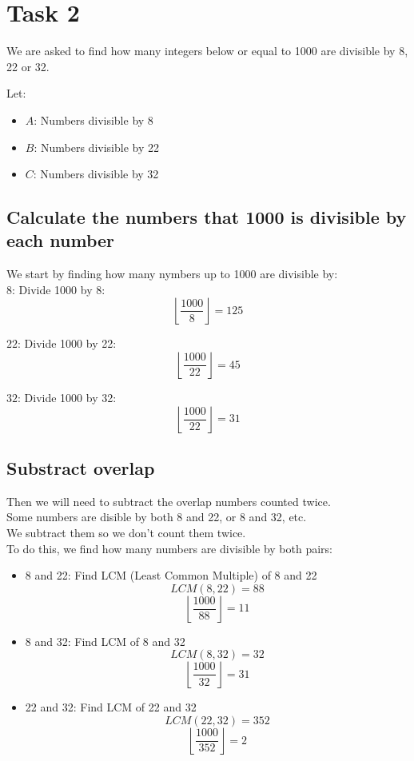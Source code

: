 \documentclass[11pt]{article}
\begin{document}
\newpage
\section{Task 2}
\label{sec:org3dbf359}
We are asked to find how many integers below or equal to 1000 are divisible by 8, 22 or 32.

Let:
\begin{itemize}
\item \(A\): Numbers divisible by 8
\item \(B\): Numbers divisible by 22
\item \(C\): Numbers divisible by 32
\end{itemize}
\subsection{Calculate the numbers that 1000 is divisible by each number}
\label{sec:orgb0bfd42}
We start by finding how many nymbers up to 1000 are divisible by: \\

\(8\): Divide 1000 by 8:
  \[
   \left\lfloor \frac{1000}{8} \right\rfloor = 125
   \]

\(22\): Divide 1000 by 22:
  \[
   \left\lfloor \frac{1000}{22} \right\rfloor = 45
   \]

\(32\): Divide 1000 by 32:
  \[
   \left\lfloor \frac{1000}{22} \right\rfloor = 31
   \]
\subsection{Substract overlap}
\label{sec:orge2ba73e}
Then we will need to subtract the overlap numbers counted twice. \\
Some numbers are disible by both 8 and 22, or 8 and 32, etc. \\
We subtract them so we don't count them twice. \\

To do this, we find how many numbers are divisible by both pairs:
\begin{itemize}
\item 8 and 22:
Find LCM (Least Common Multiple) of 8 and 22
\[
  LCM(8, 22) = 88
  \]
\[
  \left\lfloor \frac{1000}{88} \right\rfloor = 11
  \]

\item 8 and 32:
Find LCM of 8 and 32
\[
  LCM(8, 32) = 32
  \]
\[
  \left\lfloor \frac{1000}{32} \right\rfloor = 31
  \]

\item 22 and 32:
Find LCM of 22 and 32
\[
  LCM(22, 32) = 352
  \]
\[
  \left\lfloor \frac{1000}{352} \right\rfloor = 2
  \]
\end{itemize}
\end{document}
